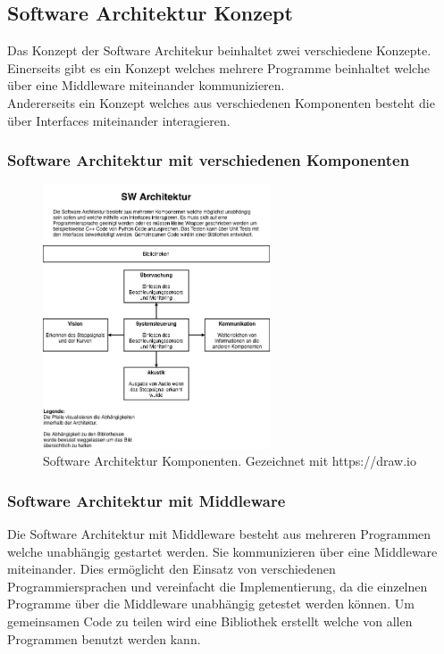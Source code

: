 \documentclass[../../main.tex]{subfiles}
\begin{document}
\subsection{Software Architektur Konzept}
Das Konzept der Software Architekur beinhaltet zwei verschiedene Konzepte.
Einerseits gibt es ein Konzept welches mehrere Programme beinhaltet welche über eine Middleware miteinander kommunizieren. \\
Andererseits ein Konzept welches aus verschiedenen Komponenten besteht die über Interfaces miteinander interagieren. \\

\subsubsection{Software Architektur mit verschiedenen Komponenten}

\begin{figure}[H] %
    \centering
    \includegraphics[width=0.6\textwidth]{../../drawings/ArchitekturDiagramm/SW_Architektur.png}
    \caption {Software Architektur Komponenten. Gezeichnet mit https://draw.io}
\end{figure}

\subsubsection{Software Architektur mit Middleware}
Die Software Architektur mit Middleware besteht aus mehreren Programmen welche unabhängig gestartet werden.
Sie kommunizieren über eine Middleware miteinander.
Dies ermöglicht den Einsatz von verschiedenen Programmiersprachen und vereinfacht die Implementierung,
da die einzelnen Programme über die Middleware unabhängig getestet werden können.
Um gemeinsamen Code zu teilen wird eine Bibliothek erstellt welche von allen Programmen benutzt werden kann.
\end{document}
